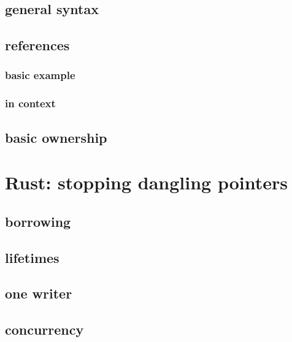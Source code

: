 \subsection{general syntax}


\subsection{references}
\subsubsection{basic example}


\subsubsection{in context}



\subsection{basic ownership}


\section{Rust: stopping dangling pointers}



\subsection{borrowing}


\subsection{lifetimes}


\subsection{one writer}


\subsection{concurrency}



